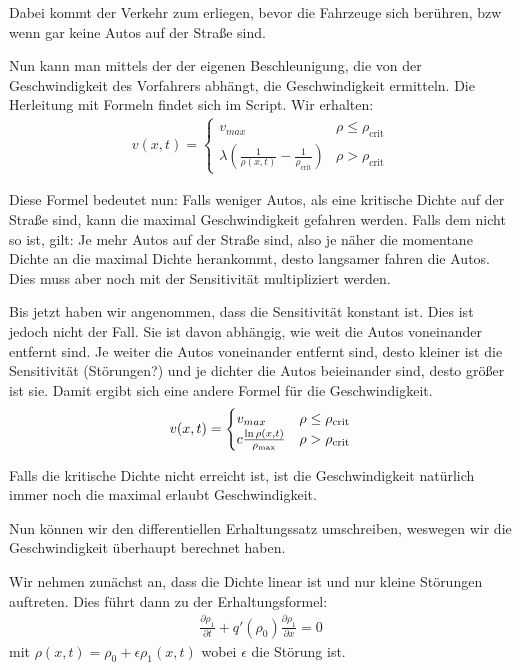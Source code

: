 \documentclass[]{article}
\begin{document}
Dabei kommt der Verkehr zum erliegen, bevor die Fahrzeuge sich berühren, bzw wenn gar keine Autos auf der Straße sind. 

Nun kann man mittels der der eigenen Beschleunigung, die von der Geschwindigkeit des Vorfahrers abhängt, die Geschwindigkeit ermitteln. Die Herleitung mit Formeln findet sich im Script. Wir erhalten: 
\begin{align*}
	v(x,t)= 
	\begin{cases}
		v_{max} & \rho \le \rho_{\text{crit}} \\
		\lambda \left(  \frac{1}{\rho(x,t)} - \frac{1}{\rho_{\text{crit}}}\right) & \rho> \rho_{\text{crit}}
	\end{cases}
\end{align*}

Diese Formel bedeutet nun: Falls weniger Autos, als eine kritische Dichte auf der Straße sind, kann die maximal Geschwindigkeit gefahren werden. 
Falls dem nicht so ist, gilt: Je mehr Autos auf der Straße sind, also je näher die momentane Dichte an die maximal Dichte herankommt, desto langsamer fahren die Autos. Dies muss aber noch mit der Sensitivität multipliziert werden.

Bis jetzt haben wir angenommen, dass die Sensitivität konstant ist. Dies ist jedoch nicht der Fall. Sie ist davon abhängig, wie weit die Autos voneinander entfernt sind. Je weiter die Autos voneinander entfernt sind, desto kleiner ist die Sensitivität (Störungen?) und je dichter die Autos beieinander sind, desto größer ist sie. Damit ergibt sich eine andere Formel für die Geschwindigkeit. 
\begin{align*}
v(x,t)= 
\begin{cases}
v_{max} & \rho \le \rho_{\text{crit}} \\
\-c \frac{\ln \rho(x,t)}{\rho_{\text{max}}} & \rho > \rho_{\text{crit}}
\end{cases}
\end{align*}

Falls die kritische Dichte nicht erreicht ist, ist die Geschwindigkeit natürlich immer noch die maximal erlaubt Geschwindigkeit. 

Nun können wir den differentiellen Erhaltungssatz umschreiben, weswegen wir die Geschwindigkeit überhaupt berechnet haben. 

Wir nehmen zunächst an, dass die Dichte linear ist und nur kleine Störungen auftreten. Dies führt dann zu der Erhaltungsformel:
\begin{align}
\label{Stoerung}
	\frac{\partial \rho_1}{\partial t} + q'(\rho_0) \frac{\partial \rho_1}{\partial x}=0
\end{align}
mit $\rho(x,t)= \rho_0 + \epsilon \rho_1(x,t)$ wobei $\epsilon$ die Störung ist.
\end{document}
